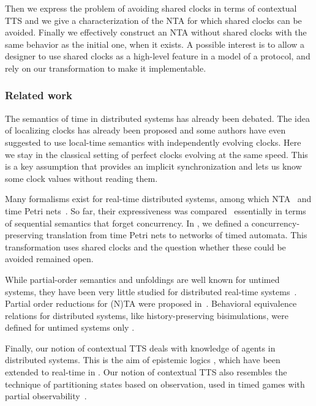 \documentclass{LMCS}
\theoremstyle{plain}\newtheorem*{prop11}{Proposition~\ref{prop:states} bis}
\begin{document}
Then we express the problem of avoiding shared clocks in terms of contextual TTS
and we give a characterization of the NTA for which shared clocks can be avoided.
Finally we effectively construct an NTA without shared clocks with the same
behavior as the initial one, when it exists.
A possible interest is to allow a designer to use shared clocks as a high-level
feature in a model of a protocol, and rely on our transformation to make it
implementable.


\subsubsection*{Related work}

The semantics of time in distributed systems has already been debated. The idea
of localizing clocks has already been proposed and some authors
\cite{ABGMN-concur08,Dima,Bengtsson98partialorder} have even suggested to use
local-time semantics with independently evolving clocks. Here we stay in the
classical setting of perfect clocks evolving at the same speed. This is a key
assumption that provides an implicit synchronization and lets us know some clock
values without reading them.

Many formalisms exist for real-time distributed systems, among which
NTA~\cite{AD94} and time Petri nets~\cite{Merlin}. So far, their
expressiveness was
compared~\cite{BCHRL-FORMATS2005,BoyerR08,Cassez-JSS06,Srba08} essentially in terms of
sequential semantics that forget concurrency. In \cite{BCH-fmsd12}, we defined a
concurrency-preserving translation from time Petri nets to networks of timed
automata. This transformation uses shared clocks and the question whether these
could be avoided remained open.

While partial-order semantics and unfoldings are well known for untimed systems,
they have been very little studied for distributed real-time
systems~\cite{Cassez-Ch-Jard_ATVA06,BHR-atva06}. Partial order reductions for (N)TA were
proposed in~\cite{Minea99,Bengtsson98partialorder,LugiezNZ05}.
Behavioral equivalence relations for distributed systems, like
history-preserving bisimulations, were defined for
untimed systems only \cite{BestDKP91,GlabbeekG01}.

Finally, our notion of contextual TTS deals with knowledge of agents in
distributed systems. This is the aim of epistemic logics
\cite{ReasoningAboutKnowledge},
which have been extended to real-time in \cite{WoznaL04, Dima09}.
Our notion of contextual TTS also resembles the technique of partitioning
states based on observation, used in timed games with partial observability~\cite{Bouyer03,David09}.
\end{document}
